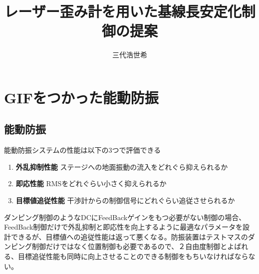 \documentclass[a4paper,12pt]{jsarticle}
\title{レーザー歪み計を用いた基線長安定化制御の提案}
\author{三代浩世希}
\begin{document}
\setcounter{tocdepth}{3}
\maketitle
\abstract{}
\tableofcontents

\section{GIFをつかった能動防振}
\subsection{能動防振}


能動防振システムの性能は以下の3つで評価できる
\begin{enumerate}
\item \textbf{外乱抑制性能} ステージへの地面振動の流入をどれぐら抑えられるか 
\item \textbf{即応性能} RMSをどれぐらい小さく抑えられるか
\item \textbf{目標値追従性能} 干渉計からの制御信号にどれぐらい追従させられるか
\end{enumerate}

ダンピング制御のようなDCにFeedBackゲインをもつ必要がない制御の場合、FeedBack制御だけで外乱抑制と即応性を向上するように最適なパラメータを設計できるが、目標値への追従性能は返って悪くなる。防振装置はテストマスのダンピング制御だけではなく位置制御も必要であるので、２自由度制御\cite{taguchi2000two}とよばれる、目標追従性能も同時に向上させることのできる制御をもちいなければならない。


\end{document}
